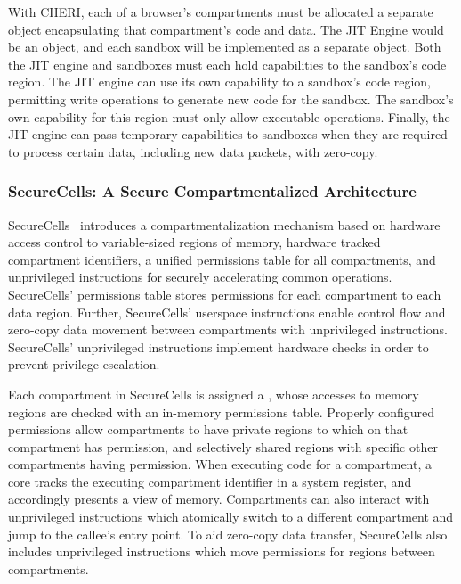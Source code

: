 With CHERI, each of a browser's compartments must be allocated a separate
object encapsulating that compartment's code and data.
The JIT Engine would be an object, and each sandbox will be implemented as
a separate object.
Both the JIT engine and sandboxes must each hold capabilities to the
sandbox's code region.
The JIT engine can use its own capability to a sandbox's code region,
permitting write operations to generate new code for the sandbox.
The sandbox's own capability for this region must only allow executable 
operations.
Finally, the JIT engine can pass temporary capabilities to sandboxes
when they are required to process certain data, including new data packets,
with zero-copy.

\subsubsection{SecureCells: A Secure Compartmentalized Architecture}
SecureCells~\cite{BhattacharyyaHLGSFP23} introduces a compartmentalization 
mechanism based on hardware
access control to variable-sized regions of memory, hardware tracked
compartment identifiers, a unified permissions table for all compartments,
and unprivileged instructions for securely accelerating common operations.
SecureCells' permissions table stores permissions for each compartment to
each data region.
Further, SecureCells' userspace instructions enable control flow and
zero-copy data movement between compartments with unprivileged instructions.
SecureCells' unprivileged instructions implement hardware checks in order
to prevent privilege escalation.

Each compartment in SecureCells is assigned a \secdiv{}, whose accesses
to memory regions are checked with an in-memory permissions table.
Properly configured permissions allow compartments to have private regions
to which on that compartment has permission, and selectively shared regions
with specific other compartments having permission. 
When executing code for a compartment, a core tracks the executing compartment
identifier in a system register, and accordingly presents a view of memory.
Compartments can also interact with unprivileged  instructions
which atomically  switch to a different compartment and jump to the callee's
entry point.
To aid zero-copy data transfer, SecureCells also includes unprivileged instructions
which move permissions for regions between compartments.

